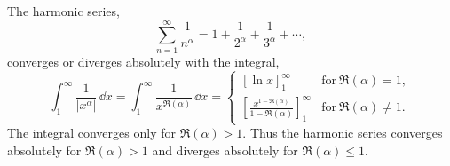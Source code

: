 {%
\begin{Solution}
  \label{solution harmonic series}
  The harmonic series,
  \[ 
  \sum_{n=1}^\infty \frac{1}{n^\alpha} = 1 + \frac{1}{2^\alpha} + \frac{1}{3^\alpha} + \cdots,
  \]
  converges or diverges absolutely with the integral,
  \[
  \int_1^\infty \frac{1}{|x^\alpha|}\,\dd x =
  \int_1^\infty \frac{1}{x^{\Re(\alpha)}}\,\dd x =
  \begin{cases}
    [\ln x]_1^\infty &\mathrm{for}\ \Re(\alpha) = 1, 
    \\
    \left[ \frac{x^{1-\Re(\alpha)}}{1-\Re(\alpha)} \right]_1^\infty &\mathrm{for}\ \Re(\alpha) \neq 1.
  \end{cases}
  \]
  The integral converges only for $\Re(\alpha) > 1$.
  Thus the harmonic series converges absolutely for $\Re(\alpha) > 1$ and diverges 
  absolutely for $\Re(\alpha) \leq 1$.
\end{Solution}


}
